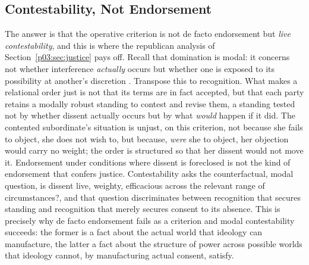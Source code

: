 \subsection{Contestability, Not Endorsement}

The answer is that the operative criterion is not de facto endorsement but \emph{live contestability}, and this is where the republican analysis of Section~\ref{p03:sec:justice} pays off. Recall that domination is modal: it concerns not whether interference \emph{actually} occurs but whether one is exposed to its possibility at another's discretion \parencite{pettit1997republicanism}. Transpose this to recognition. What makes a relational order just is not that its terms are in fact accepted, but that each party retains a modally robust standing to contest and revise them, a standing tested not by whether dissent actually occurs but by what \emph{would} happen if it did. The contented subordinate's situation is unjust, on this criterion, not because she fails to object, she does not wish to, but because, \emph{were} she to object, her objection would carry no weight; the order is structured so that her dissent would not move it. Endorsement under conditions where dissent is foreclosed is not the kind of endorsement that confers justice. Contestability asks the counterfactual, modal question, is dissent live, weighty, efficacious across the relevant range of circumstances?, and that question discriminates between recognition that secures standing and recognition that merely secures consent to its absence. This is precisely why de facto endorsement fails as a criterion and modal contestability succeeds: the former is a fact about the actual world that ideology can manufacture, the latter a fact about the structure of power across possible worlds that ideology cannot, by manufacturing actual consent, satisfy.

